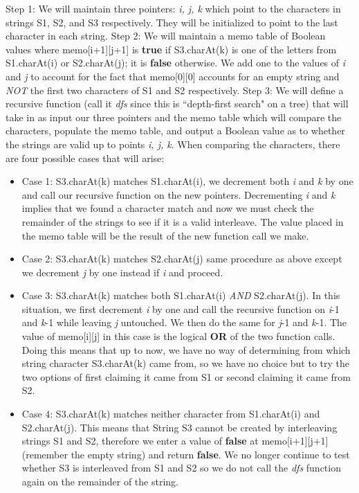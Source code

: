 \documentclass{article}
\begin{document}
\newline
\newline
Step 1: We will maintain three pointers: \textit{i, j, k} which point to the characters in strings S1, S2, and S3 respectively. They will be initialized to point to the last character in each string.
\newline
\newline
Step 2: We will maintain a memo table of Boolean values where memo[i+1][j+1] is \textbf{true} if S3.charAt(k) is one of the letters from S1.charAt(i) or S2.charAt(j); it is \textbf{false} otherwise. We add one to the values of \textit{i} and \textit{j} to account for the fact that memo[0][0] accounts for an empty string and \emph{NOT} the first two characters of S1 and S2 respectively. 
\newline
\newline
Step 3: We will define a recursive function (call it \textit{dfs} since this is ``depth-first search" on a tree) that will take in as input our three pointers and the memo table which will compare the characters, populate the memo table, and output a Boolean value as to whether the strings are valid up to points \textit{i, j, k}.
\newline
\newline
When comparing the characters, there are four possible cases that will arise:

\begin{itemize}
\item Case 1: S3.charAt(k) matches S1.charAt(i), we decrement both \textit{i} and \textit{k} by one and call our recursive function on the new pointers. Decrementing \textit{i} and \textit{k} implies that we found a character match and now we must check the remainder of the strings to see if it is a valid interleave. The value placed in the memo table will be the result of the new function call we make.
\item Case 2: S3.charAt(k) matches S2.charAt(j) same procedure as above except we decrement \textit{j} by one instead if \textit{i} and proceed.
\item Case 3: S3.charAt(k) matches both S1.charAt(i) \emph{AND} S2.charAt(j). In this situation, we first decrement \textit{i} by one and call the recursive function on \textit{i}-1 and \textit{k}-1 while leaving \textit{j} untouched. We then do the same for \textit{j}-1 and \textit{k}-1. The value of memo[i][j] in this case is the logical \textbf{OR} of the two function calls. Doing this means that up to now, we have no way of determining from which string character S3.charAt(k) came from, so we have no choice but to try the two options of first claiming it came from S1 or second claiming it came from S2.
\item Case 4: S3.charAt(k) matches neither character from S1.charAt(i) and S2.charAt(j). This means that String S3 cannot be created by interleaving strings S1 and S2, therefore we enter a value of \textbf{false} at memo[i+1][j+1] (remember the empty string) and return \textbf{false}. We no longer continue to test whether S3 is interleaved from S1 and S2 so we do not call the \textit{dfs} function again on the remainder of the string.
\end{itemize}       
\end{document}
